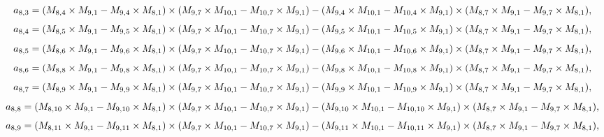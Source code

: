 \documentclass[10pt]{asme2ej}
\begin{document}
\begin{landscape}
\begin{equation}
\end{equation}
\begin{equation}
    a_{8,3} = (M_{8,4}\times M_{9,1}-M_{9,4}\times M_{8,1})\times (M_{9,7}\times M_{10,1}-M_{10,7}\times M_{9,1})\\-(M_{9,4}\times M_{10,1}-M_{10,4}\times M_{9,1})\times (M_{8,7}\times M_{9,1}-M_{9,7}\times M_{8,1}),
\end{equation}
\begin{equation}
    a_{8,4} = (M_{8,5}\times M_{9,1}-M_{9,5}\times M_{8,1})\times (M_{9,7}\times M_{10,1}-M_{10,7}\times M_{9,1})\\-(M_{9,5}\times M_{10,1}-M_{10,5}\times M_{9,1})\times (M_{8,7}\times M_{9,1}-M_{9,7}\times M_{8,1}),
\end{equation}
\begin{equation}
    a_{8,5} = (M_{8,6}\times M_{9,1}-M_{9,6}\times M_{8,1})\times (M_{9,7}\times M_{10,1}-M_{10,7}\times M_{9,1})\\-(M_{9,6}\times M_{10,1}-M_{10,6}\times M_{9,1})\times (M_{8,7}\times M_{9,1}-M_{9,7}\times M_{8,1}),
\end{equation}
\begin{equation}
    a_{8,6} = (M_{8,8}\times M_{9,1}-M_{9,8}\times M_{8,1})\times (M_{9,7}\times M_{10,1}-M_{10,7}\times M_{9,1})\\-(M_{9,8}\times M_{10,1}-M_{10,8}\times M_{9,1})\times (M_{8,7}\times M_{9,1}-M_{9,7}\times M_{8,1}),
\end{equation}
\begin{equation}
    a_{8,7} = (M_{8,9}\times M_{9,1}-M_{9,9}\times M_{8,1})\times (M_{9,7}\times M_{10,1}-M_{10,7}\times M_{9,1})\\-(M_{9,9}\times M_{10,1}-M_{10,9}\times M_{9,1})\times (M_{8,7}\times M_{9,1}-M_{9,7}\times M_{8,1}),
\end{equation}
\begin{equation}
    a_{8,8} = (M_{8,10}\times M_{9,1}-M_{9,10}\times M_{8,1})\times (M_{9,7}\times M_{10,1}-M_{10,7}\times M_{9,1})\\-(M_{9,10}\times M_{10,1}-M_{10,10}\times M_{9,1})\times (M_{8,7}\times M_{9,1}-M_{9,7}\times M_{8,1}),
\end{equation}
\begin{equation}
    a_{8,9} = (M_{8,11}\times M_{9,1}-M_{9,11}\times M_{8,1})\times (M_{9,7}\times M_{10,1}-M_{10,7}\times M_{9,1})\\-(M_{9,11}\times M_{10,1}-M_{10,11}\times M_{9,1})\times (M_{8,7}\times M_{9,1}-M_{9,7}\times M_{8,1}),
\end{equation}

\end{landscape}
\end{document}
